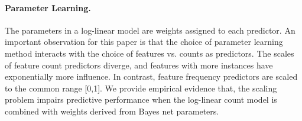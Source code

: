 \documentclass[twoside,leqno,twocolumn]{article}
\begin{document}
\paragraph{Parameter Learning.} The parameters in a log-linear model are weights assigned to each predictor.
An important observation for this paper is that the choice of parameter learning method interacts with the choice of features vs. counts as predictors. 
The scales of feature count predictors diverge, and features with more instances have exponentially more influence. 
In contrast, feature frequency predictors are scaled to the common range [0,1]. We provide empirical evidence that, 
%
the scaling problem impairs predictive performance when the log-linear count model is combined with weights derived from Bayes net parameters.
\end{document}
